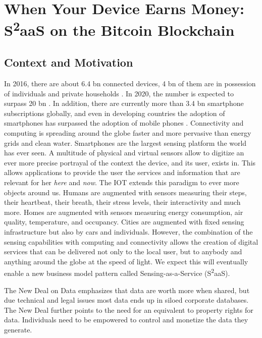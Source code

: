 \chapter{When Your Device Earns Money: S\textsuperscript{2}aaS on the Bitcoin Blockchain}
\label{sec:s2aas}


\section{Context and Motivation}

In 2016, there are about 6.4 bn connected devices, 4 bn of them are in possession of individuals and private households \parencite{Gartner2015}. In 2020, the number is expected to surpass 20 bn \parencite{Gartner2015}. In addition, there are currently more than 3.4 bn smartphone subscriptions globally, and even in developing countries the adoption of smartphones has surpassed the adoption of mobile phones \parencite{Ericsson2016}. Connectivity and computing is spreading around the globe faster and more pervasive than energy grids and clean water. Smartphones are the largest sensing platform the world has ever seen. A multitude of physical and virtual sensors allow to digitize an ever more precise portrayal of the context the device, and its user, exists in. This allows applications to provide the user the services and information that are relevant for her \emph{here} and \emph{now}. The \ac{IOT} extends this paradigm to ever more objects around us. Humans are augmented with sensors measuring their steps, their heartbeat, their breath, their stress levels, their interactivity and much more. Homes are augmented with sensors measuring energy consumption, air quality, temperature, and occupancy. Cities are augmented with fixed sensing infrastructure but also by cars and individuals.
However, the combination of the sensing capabilities with computing and connectivity allows the creation of digital services that can be delivered not only to the local user, but to anybody and anything around the globe at the speed of light. We expect this will eventually enable a new business model pattern called Sensing-as-a-Service (S\textsuperscript{2}aaS). 

The New Deal on Data \parencite{pentland2009reality} emphasizes that data are worth more when shared, but due technical and legal issues most data ends up in siloed corporate databases. The New Deal further points to the need for an equivalent to property rights for data. Individuals need to be empowered to control and monetize the data they generate. 


